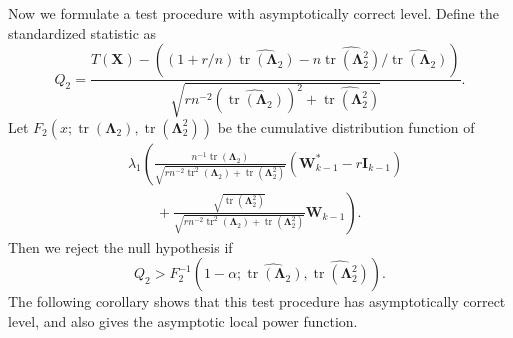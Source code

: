 \documentclass[12pt]{article} %
\DeclareMathOperator{\mytr}{tr}
\newcommand{\bX}{\mathbf{X}}
\newcommand{\bI}{\mathbf{I}}
\newcommand{\bW}{\mathbf{W}}
\newcommand{\bfsym}[1]{\ensuremath{\boldsymbol{#1}}}
\def\bLambda {\bfsym {\Lambda}}
\theoremstyle{definition}
\begin{document}
Now we formulate a test procedure with asymptotically correct level.
Define the standardized statistic as
\begin{equation*}
    Q_2=
\frac{
    T(\bX)
    -
    \left((1+r/n)\widehat{\mytr(\bLambda_2)}-n\widehat{\mytr(\bLambda_2^2)}/\widehat{\mytr(\bLambda_2)}\right)
}{
    \sqrt{
        rn^{-2}(\widehat{\mytr(\bLambda_2)})^2+ 
        \widehat{\mytr(\bLambda_2^2)}
    }
}.
\end{equation*}
Let $
F_2(x;\mytr(\bLambda_2),\mytr(\bLambda_2^2))
$ be the cumulative distribution function of
\begin{equation*}
    \begin{split}
&\lambda_1
\left(
\frac{
    n^{-1} \mytr(\bLambda_2)
}{
    \sqrt{
        rn^{-2} \mytr^2 (\bLambda_2) + \mytr(\bLambda_2^2)
    }
}
(\bW_{k-1}^* - r\bI_{k-1})
\right.
\\
&
\quad \quad
+
\left.
\frac{
    \sqrt{\mytr(\bLambda_2^2)}
}{
    \sqrt{
        rn^{-2} \mytr^2 (\bLambda_2) + \mytr(\bLambda_2^2)
    }
}
\bW_{k-1}
\right).
    \end{split}
\end{equation*}
Then we reject the null hypothesis if
\begin{equation*}
    Q_2
    >
    F_2^{-1}\left(1-\alpha;\widehat{\mytr(\bLambda_2)},\widehat{\mytr(\bLambda_2^2)}\right).
\end{equation*}
The following corollary shows that this test procedure has asymptotically correct level, and also gives the asymptotic local power function.
\end{document}
